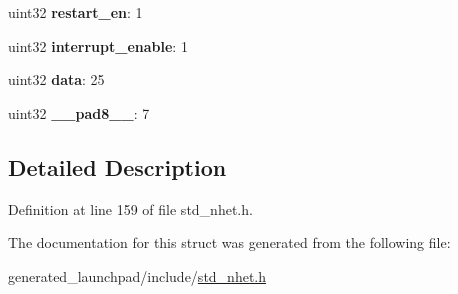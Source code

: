 \begin{DoxyCompactItemize}
uint32 {\bfseries restart\+\_\+en}\+: 1
\item 
\mbox{\label{structscmp__format_ac42c8c25de75bd2900f2da0efeb2d210}} 
uint32 {\bfseries interrupt\+\_\+enable}\+: 1
\item 
\mbox{\label{structscmp__format_a712f8a38c58b10ba6a655371b38dabf8}} 
uint32 {\bfseries data}\+: 25
\item 
\mbox{\label{structscmp__format_aaca90903b938c22a03881d60971d24c4}} 
uint32 {\bfseries \+\_\+\+\_\+pad8\+\_\+\+\_\+}\+: 7
\end{DoxyCompactItemize}


\subsection{Detailed Description}


Definition at line 159 of file std\+\_\+nhet.\+h.



The documentation for this struct was generated from the following file\+:\begin{DoxyCompactItemize}
\item 
generated\+\_\+launchpad/include/\mbox{\hyperlink{std__nhet_8h}{std\+\_\+nhet.\+h}}\end{DoxyCompactItemize}
